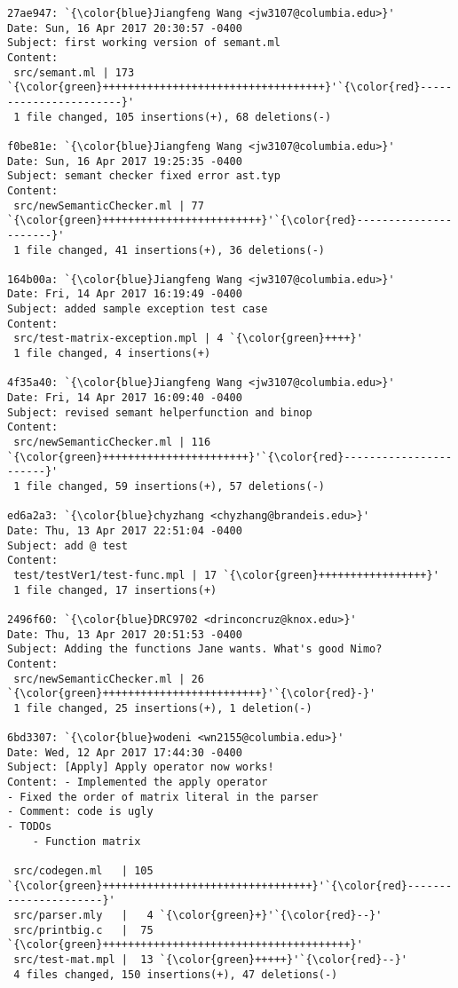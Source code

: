 \begin{lstlisting}
27ae947: `{\color{blue}Jiangfeng Wang <jw3107@columbia.edu>}'
Date: Sun, 16 Apr 2017 20:30:57 -0400
Subject: first working version of semant.ml
Content: 
 src/semant.ml | 173 `{\color{green}+++++++++++++++++++++++++++++++++++}'`{\color{red}-----------------------}'
 1 file changed, 105 insertions(+), 68 deletions(-)

f0be81e: `{\color{blue}Jiangfeng Wang <jw3107@columbia.edu>}'
Date: Sun, 16 Apr 2017 19:25:35 -0400
Subject: semant checker fixed error ast.typ
Content: 
 src/newSemanticChecker.ml | 77 `{\color{green}+++++++++++++++++++++++++}'`{\color{red}----------------------}'
 1 file changed, 41 insertions(+), 36 deletions(-)

164b00a: `{\color{blue}Jiangfeng Wang <jw3107@columbia.edu>}'
Date: Fri, 14 Apr 2017 16:19:49 -0400
Subject: added sample exception test case
Content: 
 src/test-matrix-exception.mpl | 4 `{\color{green}++++}'
 1 file changed, 4 insertions(+)

4f35a40: `{\color{blue}Jiangfeng Wang <jw3107@columbia.edu>}'
Date: Fri, 14 Apr 2017 16:09:40 -0400
Subject: revised semant helperfunction and binop
Content: 
 src/newSemanticChecker.ml | 116 `{\color{green}+++++++++++++++++++++++}'`{\color{red}-----------------------}'
 1 file changed, 59 insertions(+), 57 deletions(-)

ed6a2a3: `{\color{blue}chyzhang <chyzhang@brandeis.edu>}'
Date: Thu, 13 Apr 2017 22:51:04 -0400
Subject: add @ test
Content: 
 test/testVer1/test-func.mpl | 17 `{\color{green}+++++++++++++++++}'
 1 file changed, 17 insertions(+)

2496f60: `{\color{blue}DRC9702 <drinconcruz@knox.edu>}'
Date: Thu, 13 Apr 2017 20:51:53 -0400
Subject: Adding the functions Jane wants. What's good Nimo?
Content: 
 src/newSemanticChecker.ml | 26 `{\color{green}+++++++++++++++++++++++++}'`{\color{red}-}'
 1 file changed, 25 insertions(+), 1 deletion(-)

6bd3307: `{\color{blue}wodeni <wn2155@columbia.edu>}'
Date: Wed, 12 Apr 2017 17:44:30 -0400
Subject: [Apply] Apply operator now works!
Content: - Implemented the apply operator
- Fixed the order of matrix literal in the parser
- Comment: code is ugly
- TODOs
    - Function matrix

 src/codegen.ml   | 105 `{\color{green}+++++++++++++++++++++++++++++++++}'`{\color{red}----------------------}'
 src/parser.mly   |   4 `{\color{green}+}'`{\color{red}--}'
 src/printbig.c   |  75 `{\color{green}+++++++++++++++++++++++++++++++++++++++}'
 src/test-mat.mpl |  13 `{\color{green}+++++}'`{\color{red}--}'
 4 files changed, 150 insertions(+), 47 deletions(-)


\end{lstlisting}
